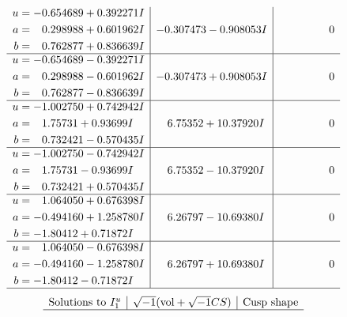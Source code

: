 \documentclass[1p]{elsarticle_modified}
\theoremstyle{definition}
\newcommand{\I}{\sqrt{-1}}
\begin{document}
$$\begin{array}{c|c|c}
\begin{aligned}
u &= -0.654689 + 0.392271 I \\
a &= \phantom{-}0.298988 + 0.601962 I \\
b &= \phantom{-}0.762877 + 0.836639 I\end{aligned}
 & -0.307473 - 0.908053 I & \phantom{-0.000000 } 0 \\ \hline\begin{aligned}
u &= -0.654689 - 0.392271 I \\
a &= \phantom{-}0.298988 - 0.601962 I \\
b &= \phantom{-}0.762877 - 0.836639 I\end{aligned}
 & -0.307473 + 0.908053 I & \phantom{-0.000000 } 0 \\ \hline\begin{aligned}
u &= -1.002750 + 0.742942 I \\
a &= \phantom{-}1.75731 + 0.93699 I \\
b &= \phantom{-}0.732421 - 0.570435 I\end{aligned}
 & \phantom{-}6.75352 + 10.37920 I & \phantom{-0.000000 } 0 \\ \hline\begin{aligned}
u &= -1.002750 - 0.742942 I \\
a &= \phantom{-}1.75731 - 0.93699 I \\
b &= \phantom{-}0.732421 + 0.570435 I\end{aligned}
 & \phantom{-}6.75352 - 10.37920 I & \phantom{-0.000000 } 0 \\ \hline\begin{aligned}
u &= \phantom{-}1.064050 + 0.676398 I \\
a &= -0.494160 + 1.258780 I \\
b &= -1.80412 + 0.71872 I\end{aligned}
 & \phantom{-}6.26797 - 10.69380 I & \phantom{-0.000000 } 0 \\ \hline\begin{aligned}
u &= \phantom{-}1.064050 - 0.676398 I \\
a &= -0.494160 - 1.258780 I \\
b &= -1.80412 - 0.71872 I\end{aligned}
 & \phantom{-}6.26797 + 10.69380 I & \phantom{-0.000000 } 0\\
 \hline 
 \end{array}$$\newpage$$\begin{array}{c|c|c}  
\text{Solutions to }I^u_{1}& \I (\text{vol} + \sqrt{-1}CS) & \text{Cusp shape}\\
 \hline 

\end{array}$$
\end{document}

